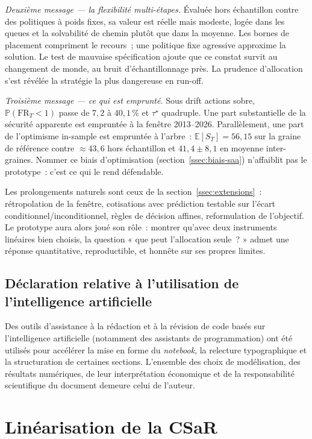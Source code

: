 \documentclass[11pt,letterpaper]{article}
\newcommand{\E}{\mathbb{E}}
\newcommand{\prob}{\mathbb{P}}
\newcommand{\taustar}{\tau^{\star}}
\theoremstyle{definition}
\begin{document}
\emph{Deuxième message --- la flexibilité multi-étapes.}
Évaluée hors échantillon contre des politiques à poids fixes, sa valeur est
réelle mais modeste, logée dans les queues et la solvabilité de chemin plutôt
que dans la moyenne. Les bornes de placement compriment le recours~; une
politique fixe agressive approxime la solution. Le test de mauvaise
spécification ajoute que ce constat survit au changement de monde, au bruit
d'échantillonnage près. La prudence d'allocation s'est révélée la stratégie la
plus dangereuse en run-off.

\emph{Troisième message --- ce qui est emprunté.}
Sous drift actions sobre, $\prob(\mathrm{FR}_T<1)$ passe de $7{,}2$ à
$40{,}1\,\%$ et $\taustar$ quadruple. Une part substantielle de la sécurité
apparente est empruntée à la fenêtre 2013--2026. Parallèlement, une part de
l'optimisme in-sample est empruntée à l'arbre~: $\E[S_T] = 56{,}15$ sur la
graine de référence contre $\approx 43{,}6$ hors échantillon et
$41{,}4 \pm 8{,}1$ en moyenne inter-graines. Nommer ce biais d'optimisation
(section~\ref{ssec:biais-saa}) n'affaiblit pas le prototype~: c'est ce qui le
rend défendable.

Les prolongements naturels sont ceux de la section~\ref{ssec:extensions}~:
rétropolation de la fenêtre, cotisations avec prédiction testable sur l'écart
conditionnel/inconditionnel, règles de décision affines, reformulation de
l'objectif. Le prototype aura alors joué son rôle~: montrer qu'avec deux
instruments linéaires bien choisis, la question « que peut l'allocation
seule~? » admet une réponse quantitative, reproductible, et honnête sur ses
propres limites.

\subsection*{Déclaration relative à l'utilisation de l'intelligence artificielle}

Des outils d'assistance à la rédaction et à la révision de code basés sur
l'intelligence artificielle (notamment des assistants de programmation) ont été
utilisés pour accélérer la mise en forme du \emph{notebook}, la relecture
typographique et la structuration de certaines sections. L'ensemble des choix
de modélisation, des résultats numériques, de leur interprétation économique et
de la responsabilité scientifique du document demeure celui de l'auteur.

\appendix
\section{Linéarisation de la CSaR}\label{app:csar}
\end{document}
